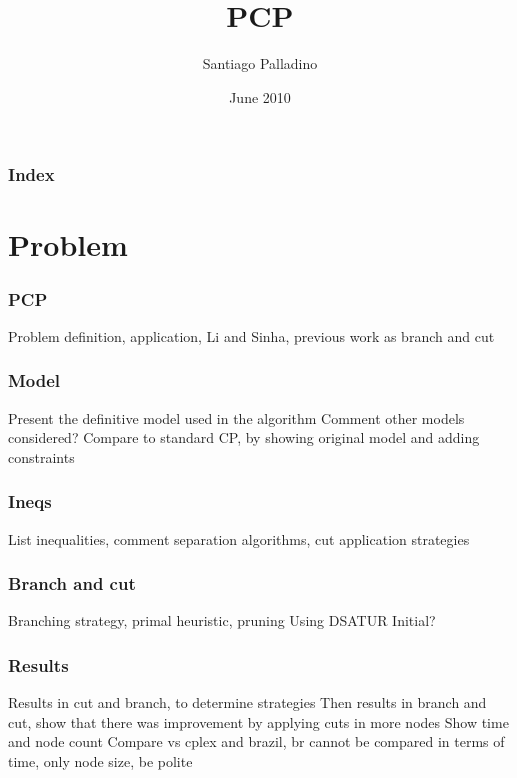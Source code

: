 \documentclass{beamer}
\begin{document}
\title{PCP}
\author{Santiago Palladino}
\date{June 2010}

\begin{frame}
\titlepage
\end{frame}

\begin{frame}
\frametitle{Index}
\tableofcontents
\end{frame} 

\setlength{\parskip}{10pt plus 1pt minus 1pt}

\section{Problem}

\begin{frame}
\frametitle{PCP}

Problem definition, application, Li and Sinha, previous work as branch and cut

\end{frame} 

\begin{frame}
\frametitle{Model}

Present the definitive model used in the algorithm
Comment other models considered?
Compare to standard CP, by showing original model and adding constraints

\end{frame} 

\begin{frame}
\frametitle{Ineqs}

List inequalities, comment separation algorithms, cut application strategies

\end{frame} 

\begin{frame}
\frametitle{Branch and cut}

Branching strategy, primal heuristic, pruning
Using DSATUR
Initial?

\end{frame} 

\begin{frame}
\frametitle{Results}

Results in cut and branch, to determine strategies
Then results in branch and cut, show that there was improvement by applying cuts in more nodes
Show time and node count
Compare vs cplex and brazil, br cannot be compared in terms of time, only node size, be polite

\end{frame} 
\end{document}
